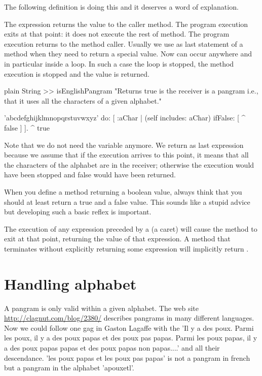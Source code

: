 \documentclass[10pt,twoside,english]{_support/latex/sbabook/sbabook}
\begin{document}
The following definition is doing this and it deserves a word of explanation. 

The expression   returns the value  to the caller method. The program execution exits at that point: it does not execute the rest of method. The program execution returns to the method caller. Usually we use  as last statement of a method when they need to return a special value. Now  can occur anywhere and in particular inside a loop. In such a case the loop is stopped, the method execution is stopped and the value is returned. 

\begin{displaycode}{plain}
String >> isEnglishPangram
	"Returns true is the receiver is a pangram i.e., that it uses all the characters of a given alphabet."
	
	'abcdefghijklmnopqrstuvwxyz' do: [ :aChar |
		(self includes: aChar)
			ifFalse: [ ^ false ]
		].
	^ true
\end{displaycode}

Note that we do not need the variable  anymore. We return  as last expression because we assume that if the execution arrives to this point, it means that all the characters of the alphabet are in the receiver; otherwise the execution would have been stopped and false would have been returned.

\begin{coffee}
When you define a method returning a boolean value, always think that you should at least return a true and a false value. This sounds like a stupid advice but developing such a basic reflex is important.
\end{coffee}

\begin{important}
The execution of any expression preceded by a \textcode{\string^} (a caret) will cause the method to exit at that point, returning the value of that expression. A method that terminates without explicitly returning some expression will implicitly return .
\end{important}
\section{Handling alphabet}
A pangram is only valid within a given alphabet. The web site \url{http://clagnut.com/blog/2380/} describes pangrams in many different languages. Now we could follow one gag in Gaston Lagaffe with the 'Il y a des poux. Parmi les poux, il y a des poux papas et des poux pas papas. Parmi les poux papas, il y a des poux papas papas et des poux papas non papas....' and all their descendance. 
'les poux papas et les poux pas papas' is not a pangram in french but a pangram in the alphabet 'apouxetl'.
\end{document}
